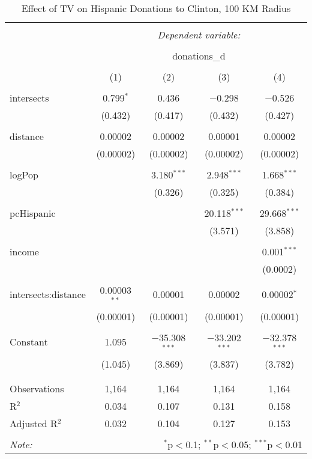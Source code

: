 
\begin{table}[!htbp] \centering 
  \caption{Effect of TV on Hispanic Donations to Clinton, 100 KM Radius} 
  \label{} 
\begin{tabular}{@{\extracolsep{-5pt}}lcccc} 
\\[-1.8ex]\hline 
\hline \\[-1.8ex] 
 & \multicolumn{4}{c}{\textit{Dependent variable:}} \\ 
\cline{2-5} 
\\[-1.8ex] & \multicolumn{4}{c}{donations\_d} \\ 
\\[-1.8ex] & (1) & (2) & (3) & (4)\\ 
\hline \\[-1.8ex] 
 intersects & 0.799$^{*}$ & 0.436 & $-$0.298 & $-$0.526 \\ 
  & (0.432) & (0.417) & (0.432) & (0.427) \\ 
  & & & & \\ 
 distance & 0.00002 & 0.00002 & 0.00001 & 0.00002 \\ 
  & (0.00002) & (0.00002) & (0.00002) & (0.00002) \\ 
  & & & & \\ 
 logPop &  & 3.180$^{***}$ & 2.948$^{***}$ & 1.668$^{***}$ \\ 
  &  & (0.326) & (0.325) & (0.384) \\ 
  & & & & \\ 
 pcHispanic &  &  & 20.118$^{***}$ & 29.668$^{***}$ \\ 
  &  &  & (3.571) & (3.858) \\ 
  & & & & \\ 
 income &  &  &  & 0.001$^{***}$ \\ 
  &  &  &  & (0.0002) \\ 
  & & & & \\ 
 intersects:distance & 0.00003$^{**}$ & 0.00001 & 0.00002 & 0.00002$^{*}$ \\ 
  & (0.00001) & (0.00001) & (0.00001) & (0.00001) \\ 
  & & & & \\ 
 Constant & 1.095 & $-$35.308$^{***}$ & $-$33.202$^{***}$ & $-$32.378$^{***}$ \\ 
  & (1.045) & (3.869) & (3.837) & (3.782) \\ 
  & & & & \\ 
\hline \\[-1.8ex] 
Observations & 1,164 & 1,164 & 1,164 & 1,164 \\ 
R$^{2}$ & 0.034 & 0.107 & 0.131 & 0.158 \\ 
Adjusted R$^{2}$ & 0.032 & 0.104 & 0.127 & 0.153 \\ 
\hline 
\hline \\[-1.8ex] 
\textit{Note:}  & \multicolumn{4}{r}{$^{*}$p$<$0.1; $^{**}$p$<$0.05; $^{***}$p$<$0.01} \\ 
\end{tabular} 
\end{table} 
